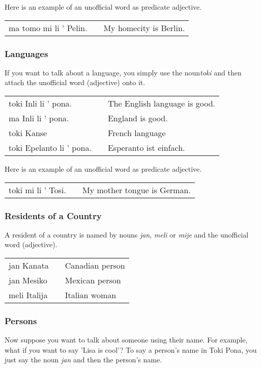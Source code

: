 Here is an example of an unofficial word as predicate adjective.

\begin{supertabular}{p{5,5cm}|ll}
    ma tomo mi li ' Pelin. &  & My homecity is Berlin. \\
\end{supertabular}

\newpage

\subsubsection*{Languages}
If you want to talk about a language, you simply use the noun\textit{toki} and then attach the unofficial word (adjective) onto it.

\begin{supertabular}{p{5,5cm}|ll}
    toki Inli li ' pona.     &  & The English language is good. \\
    ma Inli li ' pona.       &  & England is good.              \\
    toki Kanse               &  & French language               \\
    toki Epelanto li ' pona. &  & Esperanto ist einfach.        \\
\end{supertabular}

Here is an example of an unofficial word as predicate adjective.

\begin{supertabular}{p{5,5cm}|ll}
    toki mi li ' Tosi. &  & My mother tongue is German. \\
\end{supertabular}

\subsubsection*{Residents of a Country}
A resident of a country is named by nouns \textit{jan}, \textit{meli} or \textit{mije} and the unofficial word (adjective).

\begin{supertabular}{p{5,5cm}|ll}
    jan Kanata   &  & Canadian person \\
    jan Mesiko   &  & Mexican person  \\
    meli Italija &  & Italian woman   \\
\end{supertabular}

\subsubsection*{Persons}
Now suppose you want to talk about someone using their name.
For example, what if you want to say 'Lisa is cool'?
To say a person's name in Toki Pona, you just say the noun \textit{jan} and then the person's name.

